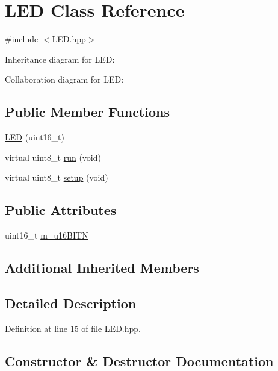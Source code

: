 \hypertarget{class_l_e_d}{}\section{L\+ED Class Reference}
\label{class_l_e_d}


{\ttfamily \#include $<$L\+E\+D.\+hpp$>$}



Inheritance diagram for L\+ED\+:


Collaboration diagram for L\+ED\+:
\subsection*{Public Member Functions}
\begin{DoxyCompactItemize}
\item 
\hyperlink{class_l_e_d_a3768224eb89ecfaa0c67ab70057c5ea1}{L\+ED} (uint16\+\_\+t)
\item 
virtual uint8\+\_\+t \hyperlink{class_l_e_d_a16d85d9f24f79a33f6a211cd1a2bccb0}{run} (void)
\item 
virtual uint8\+\_\+t \hyperlink{class_l_e_d_a4fc6b6fffe8b434fc5263fce1c33ab6b}{setup} (void)
\end{DoxyCompactItemize}
\subsection*{Public Attributes}
\begin{DoxyCompactItemize}
\item 
uint16\+\_\+t \hyperlink{class_l_e_d_abfd7a41e306daedb8aecfe02e35acd95}{m\+\_\+u16\+B\+I\+TN}
\end{DoxyCompactItemize}
\subsection*{Additional Inherited Members}


\subsection{Detailed Description}


Definition at line 15 of file L\+E\+D.\+hpp.



\subsection{Constructor \& Destructor Documentation}

